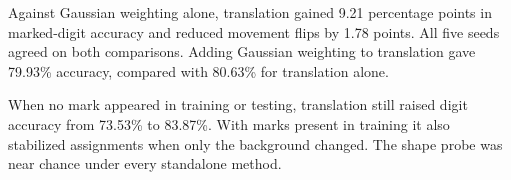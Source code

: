 \par
Against Gaussian weighting alone, translation gained 9.21 percentage points in marked-digit accuracy and reduced movement flips by 1.78 points. All five seeds agreed on both comparisons. Adding Gaussian weighting to translation gave 79.93\% accuracy, compared with 80.63\% for translation alone.
\par\bigskip
{}\par
When no mark appeared in training or testing, translation still raised digit accuracy from 73.53\% to 83.87\%. With marks present in training it also stabilized assignments when only the background changed. The shape probe was near chance under every standalone method.
